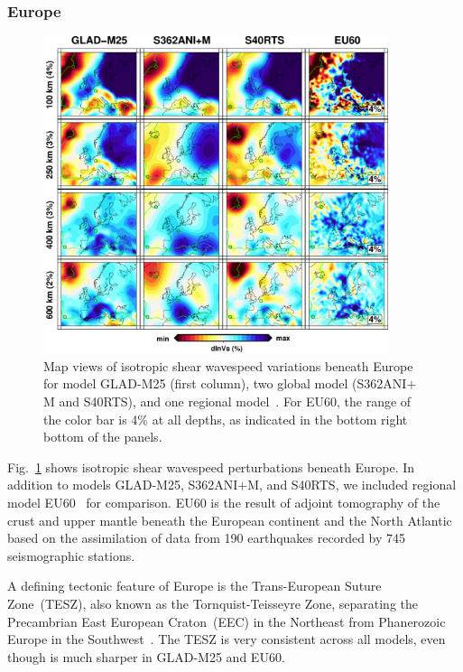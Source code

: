 \documentclass[extra,mreferee]{gji}
\begin{document}
\subsubsection{Europe}

\begin{figure}[ht!]
\includegraphics[width=0.9\textwidth]{figures/depth_slice/europe_vs.pdf}
  \caption{\small{Map views of isotropic shear wavespeed variations beneath Europe for model GLAD-M25 (first column), two global model (S362ANI$+$M and S40RTS), and
  one regional model~\citep[EU60;][]{zhu2015seismic}. For EU60, the range of the color
  bar is 4\% at all depths, as indicated in the bottom right bottom of the panels.}}
\label{fig:europe-vs}
\centering
\end{figure}

Fig.~\ref{fig:europe-vs} shows isotropic shear wavespeed perturbations beneath Europe.
In addition to models GLAD-M25, S362ANI$+$M, and S40RTS, we included regional
model EU60~\citep{zhu2015seismic} for comparison.
EU60 is the result of adjoint tomography of the crust and upper mantle
beneath the European continent and the North Atlantic based on the assimilation of data from
190 earthquakes recorded by 745 seismographic stations.

A defining tectonic feature of Europe is the Trans-European Suture Zone~(TESZ),
also known as the Tornquist-Teisseyre Zone,
separating the Precambrian East European Craton~(EEC) in the Northeast from
Phanerozoic Europe in the Southwest~\citep{zielhuis1994deep}.
The TESZ is very consistent across all models,
even though is much sharper in GLAD-M25 and EU60.
\end{document}
